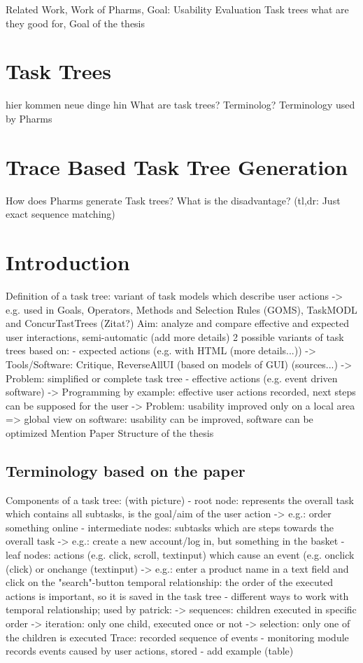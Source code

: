 Related Work, Work of Pharms, Goal: Usability Evaluation \citep{harms2013}
Task trees what are they good for, Goal of the thesis
\section{Task Trees}
hier kommen neue dinge hin
What are task trees? Terminolog? Terminology used by Pharms
\section{Trace Based Task Tree Generation}
How does Pharms generate Task trees? What is the disadvantage? (tl,dr: Just exact sequence matching)

\section{Introduction}
Definition of a task tree: variant of task models which describe user actions
    -> e.g. used in Goals, Operators, Methods and Selection Rules (GOMS), TaskMODL and ConcurTastTrees (Zitat?)
Aim: analyze and compare effective and expected user interactions, semi-automatic (add more details)
2 possible variants of task trees based on: 
  - expected actions (e.g. with HTML (more details...))
      -> Tools/Software: Critique, ReverseAllUI (based on models of GUI) (sources...)
      -> Problem: simplified or complete task tree
  - effective actions (e.g. event driven software)
      -> Programming by example: effective user actions recorded, next steps can be supposed for the user
      -> Problem: usability improved only on a local area
=> global view on software: usability can be improved, software can be optimized 
Mention Paper
Structure of the thesis

\subsection{Terminology based on the paper}
Components of a task tree: (with picture)
  - root node: represents the overall task which contains all subtasks, is the goal/aim of the user action
    -> e.g.: order something online
  - intermediate nodes: subtasks which are steps towards the overall task
    -> e.g.: create a new account/log in, but something in the basket
  - leaf nodes: actions (e.g. click, scroll, textinput) which cause an event (e.g. onclick (click) or onchange (textinput)
    -> e.g.: enter a product name in a text field and click on the "search"-button
temporal relationship: the order of the executed actions is important, so it is saved in the task tree
  - different ways to work with temporal relationship; used by patrick: 
    -> sequences: children executed in specific order
    -> iteration: only one child, executed once or not
    -> selection: only one of the children is executed
Trace: recorded sequence of events
  - monitoring module records events caused by user actions, stored 
  - add example (table)

